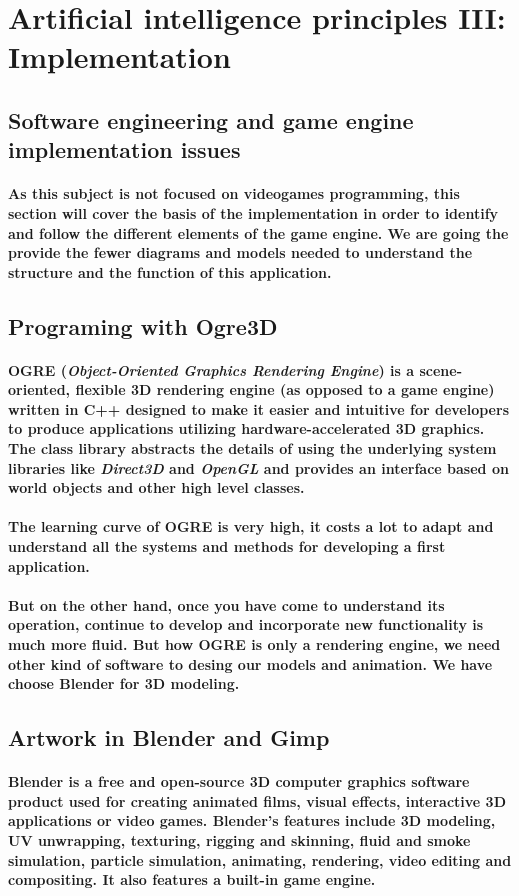 \documentclass[a4paper,10pt]{article}
\newcommand{\p}[1]{\paragraph{\indent\textnormal{#1}}}
\begin{document}
\newpage
\section{Artificial intelligence principles III: Implementation}

  \subsection{Software engineering and game engine implementation issues}

    \p{As this subject is not focused on videogames programming, this section will cover the basis of the implementation in order to identify and follow the different elements of the game engine. We are going the provide the fewer diagrams and models needed to understand the structure and the function of this application.}


  \subsection{Programing with Ogre3D}

    \p{\textbf{OGRE} (\textit{Object-Oriented Graphics Rendering Engine}) is a scene-oriented, flexible 3D rendering engine (as opposed to a game engine) written in \textbf{C++} designed to make it easier and intuitive for developers to produce applications utilizing hardware-accelerated 3D graphics. The class library abstracts the details of using the underlying system libraries like \textit{Direct3D} and \textit{OpenGL} and provides an interface based on world objects and other high level classes.}

    \p{The learning curve of OGRE is very high, it costs a lot to adapt and understand all the systems and methods for developing a first application.}

    \p{But on the other hand, once you have come to understand its operation, continue to develop and incorporate new functionality is much more fluid. But how OGRE is only a rendering engine, we need other kind of software to desing our models and animation. We have choose Blender for 3D modeling.}

  \subsection{Artwork in Blender and Gimp}

    \p{\textbf{Blender} is a free and open-source 3D computer graphics software product used for creating animated films, visual effects, interactive 3D applications or video games. Blender's features include 3D modeling, UV unwrapping, texturing, rigging and skinning, fluid and smoke simulation, particle simulation, animating, rendering, video editing and compositing. It also features a built-in game engine.}
\end{document}
